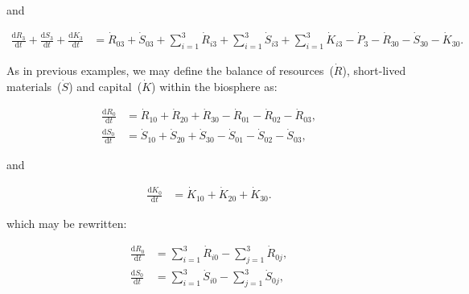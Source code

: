 \noindent{}and

\begin{align}
	\label{eq:C_CV_3}
	\frac{\mathrm{d}R_{3}}{\mathrm{d}t} 
	+ \frac{\mathrm{d}S_{3}}{\mathrm{d}t}	
	+ \frac{\mathrm{d}K_{3}}{\mathrm{d}t}		
	& =  \dot{R}_{03} 
	+ \dot{S}_{03}
	+ \sum_{i = 1}^{3}\dot{R}_{i3}
	+ \sum_{i = 1}^{3}\dot{S}_{i3}
	+ \sum_{i = 1}^{3}\dot{K}_{i3}
	- \dot{P}_{3}
	- \dot{R}_{30} 
	- \dot{S}_{30}
	- \dot{K}_{30}.										
\end{align}

%

As in previous examples,
we may define the balance of 
resources~($\dot{R}$),
short-lived materials~($\dot{S}$) and
capital~($\dot{K}$) within the biosphere as:

\begin{align}\label{eq:C_dR0}
	\frac{\mathrm{d}R_{0}}{\mathrm{d}t}	&
	= \dot{R}_{10}
	+ \dot{R}_{20}
	+ \dot{R}_{30}
	- \dot{R}_{01}
	- \dot{R}_{02}
	- \dot{R}_{03},										\\
\label{eq:C_dS0}
	\frac{\mathrm{d}S_{0}}{\mathrm{d}t}	&
	= \dot{S}_{10}
	+ \dot{S}_{20}
	+ \dot{S}_{30}	
	- \dot{S}_{01}
	- \dot{S}_{02}
	- \dot{S}_{03},
\end{align}

\noindent{}and

\begin{align}
\label{eq:C_dK0}
	\frac{\mathrm{d}K_{0}}{\mathrm{d}t}	&
	= \dot{K}_{10}
	+ \dot{K}_{20}
	+ \dot{K}_{30}.
\end{align}

\noindent{}which may be rewritten:

\begin{align}
\label{eq:C_dR0a}
	\frac{\mathrm{d}R_{0}}{\mathrm{d}t}	&
	= \sum_{i = 1}^{3}\dot{R}_{i0}
	- \sum_{j = 1}^{3}\dot{R}_{0j},				\\
\label{eq:C_dS0a}
	\frac{\mathrm{d}S_{0}}{\mathrm{d}t}	&
	= \sum_{i = 1}^{3}\dot{S}_{i0}
	- \sum_{j = 1}^{3}\dot{S}_{0j},
\end{align}

